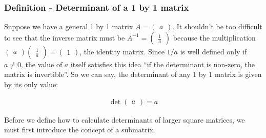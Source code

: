 \documentclass[usenames,dvipsnames,aspectratio=169,10pt]{beamer}
\numberwithin{equation}{section}
\begin{document}
\begin{frame}
\frametitle{Definition - Determinant of a 1 by 1 matrix}

Suppose we have a general 1 by 1 matrix $A = \begin{pmatrix} a \end{pmatrix}$. It shouldn't be too difficult to see that the inverse matrix must be $A^{-1} = \begin{pmatrix} \frac{1}{a} \end{pmatrix}$ because the multiplication $\begin{pmatrix} a \end{pmatrix}\begin{pmatrix} \frac{1}{a} \end{pmatrix} = \begin{pmatrix} 1 \end{pmatrix}$, the identity matrix. Since $1/a$ is well defined only if $a\neq 0$, the value of $a$ itself satisfies this idea ``if the determinant is non-zero, the matrix is invertible''. So we can say, the determinant of any 1 by 1 matrix is given by its only value:

\begin{align*}
\det \begin{pmatrix} a \end{pmatrix} = a
\end{align*}

Before we define how to calculate determinants of larger square matrices, we must first introduce the concept of a submatrix.
\end{frame}
\end{document}
